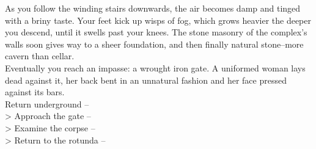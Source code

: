As you follow the winding stairs downwards, the air becomes damp and tinged with a briny taste. Your feet kick up wisps of fog, which grows heavier the deeper you descend, until it swells past your knees. The stone masonry of the complex's walls soon gives way to a sheer foundation, and then finally natural stone--more cavern than cellar.\\

Eventually you reach an impasse: a wrought iron gate. A uniformed woman lays dead against it, her back bent in an unnatural fashion and her face pressed against its bars.\\

 Return underground -- \\
> Approach the gate -- \\
> Examine the corpse -- \\
> Return to the rotunda -- 
